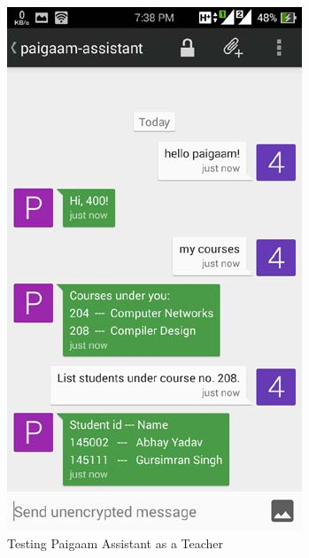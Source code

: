 \begin{itemize}
\begin{figure}[ht]
\centering
\includegraphics[scale=0.3]{input/images/s12.png}
\caption{Testing Paigaam Assistant as a Teacher}
\end{figure}
\end{itemize}
